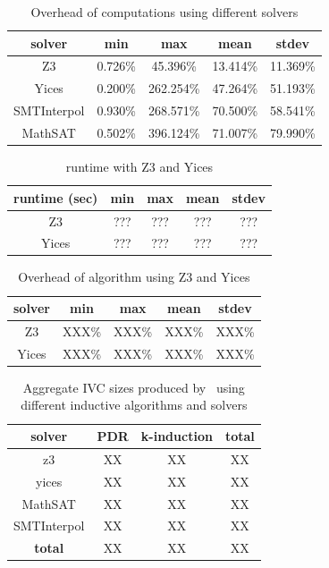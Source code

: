 \begin{table}
  \centering
  \begin{tabular}{ |c||c|c|c|c| }
    \hline
     solver & min & max & mean & stdev \\[0.5ex]
    \hline
    Z3   & 0.726\% & 45.396\% & 13.414\% & 11.369\% \\[0.5ex]
    Yices &   0.200\%  & 262.254\%   & 47.264\% & 51.193\% \\[0.5ex]
    SMTInterpol& 0.930\% & 268.571\% &  70.500\% & 58.541\%\\[0.5ex]
    MathSAT & 0.502\% & 396.124\% &  71.007\% & 79.990\%\\[0.5ex]
    \hline
  \end{tabular}
  \caption{Overhead of \ucalg computations using different solvers}
  \label{tab:overhead-ucalg}
\end{table}

\begin{table}
  \centering
  \begin{tabular}{ |c||c|c|c|c| }
    \hline
     runtime (sec) & min & max & mean & stdev \\[0.5ex]
    \hline\hline
    Z3   & ??? & ??? & ??? & ??? \\[0.5ex]
    Yices &   ???  & ???   & ??? & ??? \\[0.5ex]
    \hline
  \end{tabular}
  \caption{\ucbfalg runtime with Z3 and Yices}
  \label{tab:runtime-ucbfalg}
\end{table}

\begin{table}
  \centering
  \begin{tabular}{ |c||c|c|c|c| }
    \hline
     solver & min & max & mean & stdev \\[0.5ex]
    \hline
    Z3   & XXX\% & XXX\% & XXX\% & XXX\% \\[0.5ex]
    Yices &   XXX\%  & XXX\%   & XXX\% & XXX\% \\[0.5ex]
    \hline
  \end{tabular}
  \caption{Overhead of \ucbfalg algorithm using Z3 and Yices}
  \label{tab:overhead-ucbfalg}
\end{table}


\begin{table}
  \centering
  \begin{tabular}{ |c|c|c|c| }
    \hline
     solver & PDR & k-induction & \textbf{total} \\
    \hline
      z3 & XX & XX & XX \\
      yices & XX & XX & XX \\ 
      MathSAT & XX & XX & XX \\ 
      SMTInterpol & XX & XX & XX \\
    \hline
      \textbf{total} & XX & XX & XX \\ 
    \hline
  \end{tabular}
  \caption{Aggregate IVC sizes produced by \ucalg\ using different inductive algorithms and solvers}
  \label{tab:minimality-algorithm-solvers}
\end{table}

